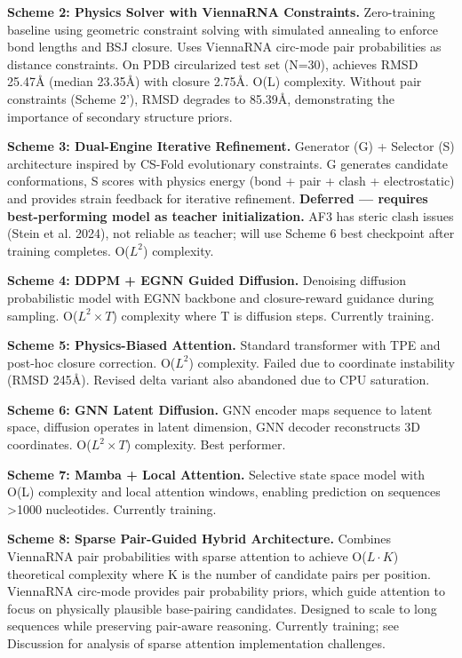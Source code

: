 \textbf{Scheme 2: Physics Solver with ViennaRNA Constraints.} Zero-training baseline using geometric constraint solving with simulated annealing to enforce bond lengths and BSJ closure. Uses ViennaRNA circ-mode pair probabilities as distance constraints. On PDB circularized test set (N=30), achieves RMSD 25.47Å (median 23.35Å) with closure 2.75Å. O(L) complexity. Without pair constraints (Scheme 2'), RMSD degrades to 85.39Å, demonstrating the importance of secondary structure priors.

\textbf{Scheme 3: Dual-Engine Iterative Refinement.} Generator (G) + Selector (S) architecture inspired by CS-Fold evolutionary constraints. G generates candidate conformations, S scores with physics energy (bond + pair + clash + electrostatic) and provides strain feedback for iterative refinement. \textbf{Deferred — requires best-performing model as teacher initialization.} AF3 has steric clash issues (Stein et al. 2024), not reliable as teacher; will use Scheme 6 best checkpoint after training completes. O($L^2$) complexity.

\textbf{Scheme 4: DDPM + EGNN Guided Diffusion.} Denoising diffusion probabilistic model \citep{ho2020} with EGNN backbone and closure-reward guidance during sampling. O($L^2 \times T$) complexity where T is diffusion steps. Currently training.

\textbf{Scheme 5: Physics-Biased Attention.} Standard transformer with TPE and post-hoc closure correction. O($L^2$) complexity. Failed due to coordinate instability (RMSD 245\AA). Revised delta variant also abandoned due to CPU saturation.

\textbf{Scheme 6: GNN Latent Diffusion.} GNN encoder maps sequence to latent space, diffusion operates in latent dimension, GNN decoder reconstructs 3D coordinates. O($L^2 \times T$) complexity. Best performer.

\textbf{Scheme 7: Mamba + Local Attention.} Selective state space model \citep{gu2023} with O(L) complexity and local attention windows, enabling prediction on sequences >1000 nucleotides. Currently training.

\textbf{Scheme 8: Sparse Pair-Guided Hybrid Architecture.} Combines ViennaRNA pair probabilities with sparse attention to achieve O($L \cdot K$) theoretical complexity where K is the number of candidate pairs per position. ViennaRNA circ-mode provides pair probability priors, which guide attention to focus on physically plausible base-pairing candidates. Designed to scale to long sequences while preserving pair-aware reasoning. Currently training; see Discussion for analysis of sparse attention implementation challenges.

